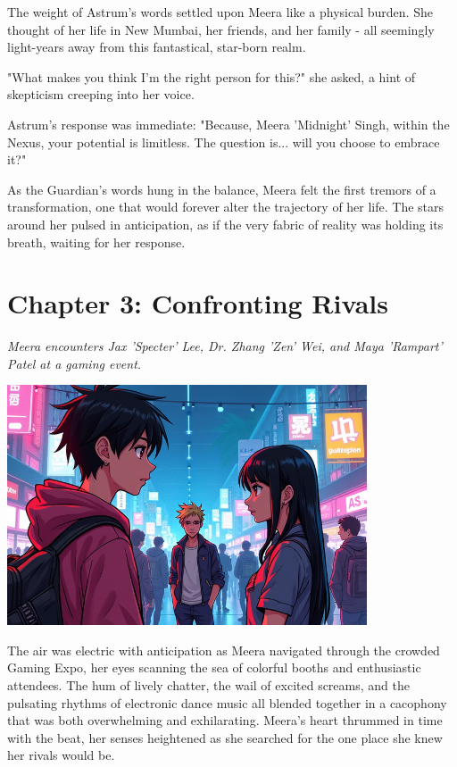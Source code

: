 \documentclass[12pt]{report}  %
\begin{document}
The weight of Astrum's words settled upon Meera like a physical burden.
She thought of her life in New Mumbai, her friends, and her family - all
seemingly light-years away from this fantastical, star-born realm.

"What makes you think I'm the right person for this?" she asked, a hint
of skepticism creeping into her voice.

Astrum's response was immediate: "Because, Meera 'Midnight' Singh,
within the Nexus, your potential is limitless. The question is... will
you choose to embrace it?"

As the Guardian's words hung in the balance, Meera felt the first
tremors of a transformation, one that would forever alter the trajectory
of her life. The stars around her pulsed in anticipation, as if the very
fabric of reality was holding its breath, waiting for her response.


\chapter*{Chapter 3: Confronting Rivals}
\textit{Meera encounters Jax 'Specter' Lee, Dr. Zhang 'Zen' Wei, and Maya 'Rampart' Patel at a gaming event.}

\begin{center}
\includegraphics[width=0.8\textwidth]{stories/my_story/step_6/scenes/rival_encounter.live.png}
\end{center}

The air was electric with anticipation as Meera navigated through the
crowded Gaming Expo, her eyes scanning the sea of colorful booths and
enthusiastic attendees. The hum of lively chatter, the wail of excited
screams, and the pulsating rhythms of electronic dance music all blended
together in a cacophony that was both overwhelming and exhilarating.
Meera's heart thrummed in time with the beat, her senses heightened as
she searched for the one place she knew her rivals would be.
\end{document}

